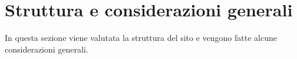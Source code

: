 \section{Struttura e considerazioni generali}\label{struct}
In questa sezione viene valutata la struttura del sito e vengono 
fatte alcune considerazioni generali.
  
  
